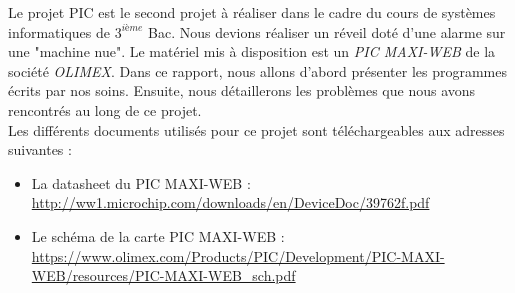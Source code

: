 Le projet PIC est le second projet à réaliser dans le cadre du cours de systèmes informatiques de $3^{ième}$ Bac. Nous devions réaliser un réveil doté d'une alarme sur une "machine nue". Le matériel mis à disposition est un \textit{PIC MAXI-WEB} de la société \textit{OLIMEX}. Dans ce rapport, nous allons d'abord présenter les programmes écrits par nos soins. Ensuite, nous détaillerons les problèmes que nous avons rencontrés au long de ce projet. \\
Les différents documents utilisés pour ce projet sont téléchargeables aux adresses suivantes :
\begin{itemize}
\item La datasheet du PIC MAXI-WEB : \url{http://ww1.microchip.com/downloads/en/DeviceDoc/39762f.pdf}
\item Le schéma de la carte PIC MAXI-WEB : \url{https://www.olimex.com/Products/PIC/Development/PIC-MAXI-WEB/resources/PIC-MAXI-WEB_sch.pdf}
\end{itemize}
